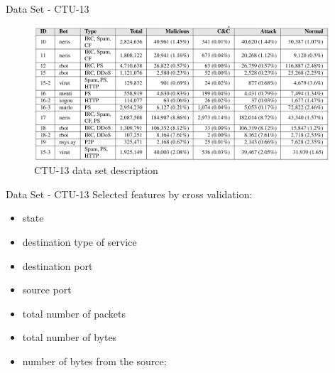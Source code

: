 \documentclass[newPxFont, numfooter, sectionpages]{beamer}
\begin{document}
\begin{frame}[c]{Data Set - CTU-13}
    \begin{figure}[h!]
    	\centering
    	\includegraphics[width=11cm]{figures/ch4/ctu13.png}
    	\caption{CTU-13 data set description}
    	\label{fig:4.04}
    \end{figure}
\end{frame}



\begin{frame}[c]{Data Set - CTU-13}
    Selected features by cross validation: 
    \begin{itemize}
        \item state
        \item destination type of service
        \item destination port
        \item source port
        \item total number of packets
        \item total number of bytes
        \item number of bytes from the source;
    \end{itemize}
\end{frame}
\end{document}
